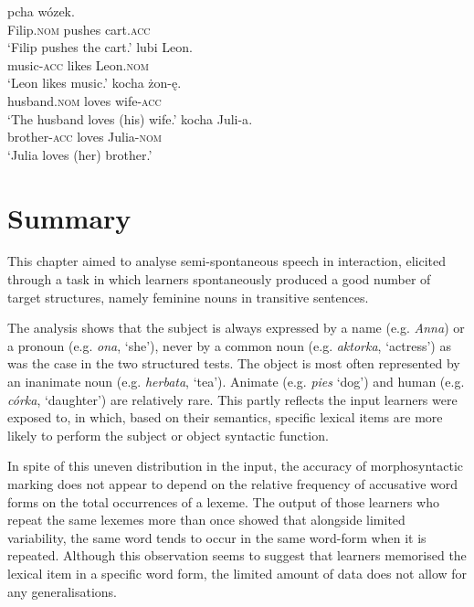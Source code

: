 \ea%
    \label{ex:07:11}
    \ea\label{ex:07:11a}
        {pcha}    {wózek}.\\
            Filip\textsc{.nom}  pushes  cart\textsc{.acc}\\
    \glt    ‘Filip pushes the cart.’
    \ex\label{ex:07:11b}
      {lubi}  {Leon}.\\
            music-\textsc{acc}  likes  Leon\textsc{.nom}\\
    \glt    ‘Leon likes music.’
    \ex\label{ex:07:11c}
          {kocha}  {żon-ę}.\\
            husband\textsc{.nom}  loves  wife-\textsc{acc}\\
    \glt    ‘The husband loves (his) wife.’
    \ex\label{ex:07:11d}
        {kocha}  {Juli-a}.\\
            brother-\textsc{acc}  loves  Julia-\textsc{nom}\\
    \glt    ‘Julia loves (her) brother.’
    \z
\z

\section{Summary}\label{sec:07:6}

This chapter aimed to analyse semi-spontaneous speech in interaction, elicited through a task in which learners spontaneously produced a good number of target structures, namely feminine nouns in transitive sentences.

The analysis shows that the subject is always expressed by a name (e.g. \textit{Anna}) or a pronoun (e.g. \textit{ona}, ‘she’), never by a common noun (e.g. \textit{aktorka}, ‘actress’) as was the case in the two structured tests. The object is most often represented by an inanimate noun (e.g. \textit{herbata}, ‘tea’). Animate (e.g. \textit{pies} ‘dog’) and human (e.g. \textit{córka}, ‘daughter’) are relatively rare. This partly reflects the input learners were exposed to, in which, based on their semantics, specific lexical items are more likely to perform the subject or object syntactic function.

In spite of this uneven distribution in the input, the accuracy of morphosyntactic marking does not appear to depend on the relative frequency of accusative word forms on the total occurrences of a lexeme. The output of those learners who repeat the same lexemes more than once showed that alongside limited variability, the same word tends to occur in the same word-form when it is repeated. Although this observation seems to suggest that learners memorised the lexical item in a specific word form, the limited amount of data does not allow for any generalisations.

